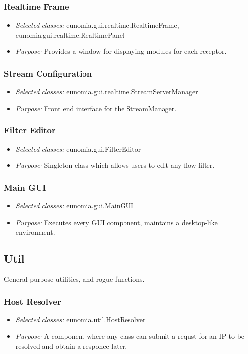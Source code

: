 \documentclass[titlepage,12pt]{article}
\begin{document}
\subsubsection{Realtime Frame}
\begin{itemize}
\item \emph{Selected classes:} eunomia.gui.realtime.RealtimeFrame, eunomia.gui.realtime.RealtimePanel
\item \emph{Purpose:} Provides a window for displaying modules for each receptor.
\end{itemize}

\subsubsection{Stream Configuration}
\begin{itemize}
\item \emph{Selected classes:} eunomia.gui.realtime.StreamServerManager
\item \emph{Purpose:} Front end interface for the StreamManager.
\end{itemize}

\subsubsection{Filter Editor}
\begin{itemize}
\item \emph{Selected classes:} eunomia.gui.FilterEditor
\item \emph{Purpose:} Singleton class which allows users to edit any flow filter.
\end{itemize}

\subsubsection{Main GUI}
\begin{itemize}
\item \emph{Selected classes:} eunomia.gui.MainGUI
\item \emph{Purpose:} Executes every GUI component, maintains a desktop-like environment.
\end{itemize}

\subsection{Util}

General purpose utilities, and rogue functions.

\subsubsection{Host Resolver}
\begin{itemize}
\item \emph{Selected classes:} eunomia.util.HostResolver
\item \emph{Purpose:} A component where any class can submit a requst for an IP to be resolved and obtain a responce later.
\end{itemize}
\end{document}
